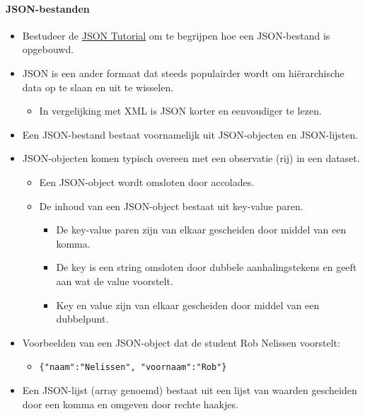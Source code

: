 \documentclass[]{tufte-book}
\providecommand{\tightlist}{%
  \setlength{\itemsep}{0pt}\setlength{\parskip}{0pt}}
\begin{document}
\hypertarget{json-bestanden}{%
\paragraph{JSON-bestanden}\label{json-bestanden}}

\begin{itemize}
\tightlist
\item
  Bestudeer de \href{http://beginnersbook.com/2015/04/json-tutorial/}{JSON Tutorial} om te begrijpen hoe een JSON-bestand is opgebouwd.
\item
  JSON is een ander formaat dat steeds populairder wordt om hiërarchische data op te slaan en uit te wisselen.

  \begin{itemize}
  \tightlist
  \item
    In vergelijking met XML is JSON korter en eenvoudiger te lezen.
  \end{itemize}
\item
  Een JSON-bestand bestaat voornamelijk uit JSON-objecten en JSON-lijsten.
\item
  JSON-objecten komen typisch overeen met een observatie (rij) in een dataset.

  \begin{itemize}
  \tightlist
  \item
    Een JSON-object wordt omsloten door accolades.
  \item
    De inhoud van een JSON-object bestaat uit key-value paren.

    \begin{itemize}
    \tightlist
    \item
      De key-value paren zijn van elkaar gescheiden door middel van een komma.
    \item
      De key is een string omsloten door dubbele aanhalingstekens en geeft aan wat de value voorstelt.
    \item
      Key en value zijn van elkaar gescheiden door middel van een dubbelpunt.
    \end{itemize}
  \end{itemize}
\item
  Voorbeelden van een JSON-object dat de student Rob Nelissen voorstelt:

  \begin{itemize}
  \tightlist
  \item
    \texttt{\{"naam":"Nelissen",\ "voornaam":"Rob"\}}
  \end{itemize}
\item
  Een JSON-lijst (array genoemd) bestaat uit een lijst van waarden gescheiden door een komma en omgeven door rechte haakjes.


\end{itemize}
\end{document}

